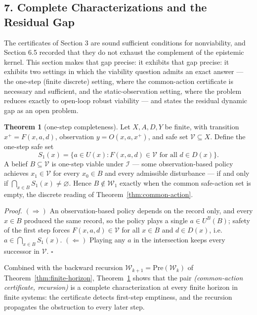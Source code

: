 \documentclass[10pt,twocolumn]{article}
\theoremstyle{definition}
\newtheorem{theorem}{Theorem}
\begin{document}
\subsection{7. Complete Characterizations and the Residual Gap}\label{complete-characterizations}

The certificates of Section 3 are sound sufficient conditions for nonviability, and Section 6.5 recorded that they do not exhaust the complement of the epistemic kernel. This section makes that gap precise: it exhibits that gap precise: it exhibits two settings in which the viability question admits an exact answer --- the one-step (finite discrete) setting, where the common-action certificate is necessary and sufficient, and the static-observation setting, where the problem reduces exactly to open-loop robust viability --- and states the residual dynamic gap as an open problem.

\begin{theorem}[one-step completeness]\label{thm:onestep}
Let \(X, A, D, Y\) be finite, with transition \(x^{+} = F(x,a,d)\), observation \(y = O(x,a,x^{+})\), and safe set \(\mathcal{V} \subseteq X\). Define the one-step safe set
\[
S_{1}(x) = \bigl\{ a \in U(x) : F(x,a,d) \in \mathcal{V} \text{ for all } d \in D(x) \bigr\}.
\]
A belief \(B \subseteq \mathcal{V}\) is one-step viable under \(\mathcal{I}\) --- some observation-based policy achieves \(x_{1} \in \mathcal{V}\) for every \(x_{0} \in B\) and every admissible disturbance --- if and only if \(\bigcap_{x \in B} S_{1}(x) \neq \varnothing\). Hence \(B \notin \mathcal{W}_{1}\) exactly when the common safe-action set is empty, the discrete reading of Theorem~\ref{thm:common-action}.
\end{theorem}

\emph{Proof.} \((\Rightarrow)\) An observation-based policy depends on the record only, and every \(x \in B\) produced the same record, so the policy plays a single \(a \in U^{B}(B)\); safety of the first step forces \(F(x,a,d) \in \mathcal{V}\) for all \(x \in B\) and \(d \in D(x)\), i.e.\ \(a \in \bigcap_{x \in B} S_{1}(x)\). \((\Leftarrow)\) Playing any \(a\) in the intersection keeps every successor in \(\mathcal{V}\). \hfill\(\square\)

Combined with the backward recursion \(\mathcal{W}_{k+1} = \mathrm{Pre}(\mathcal{W}_{k})\) of Theorem~\ref{thm:finite-horizon}, Theorem~\ref{thm:onestep} shows that the pair \emph{(common-action certificate, recursion)} is a complete characterization at every finite horizon in finite systems: the certificate detects first-step emptiness, and the recursion propagates the obstruction to every later step.
\end{document}
